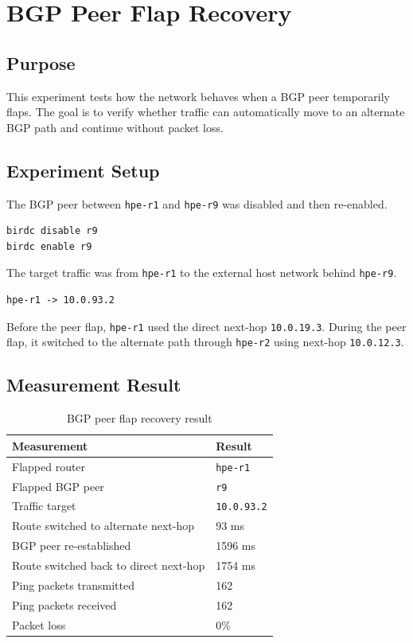 \section{BGP Peer Flap Recovery}

\subsection{Purpose}

This experiment tests how the network behaves when a BGP peer temporarily flaps. The goal is to verify whether traffic can automatically move to an alternate BGP path and continue without packet loss.

\subsection{Experiment Setup}

The BGP peer between \texttt{hpe-r1} and \texttt{hpe-r9} was disabled and then re-enabled.

\begin{verbatim}
birdc disable r9
birdc enable r9
\end{verbatim}

The target traffic was from \texttt{hpe-r1} to the external host network behind \texttt{hpe-r9}.

\begin{verbatim}
hpe-r1 -> 10.0.93.2
\end{verbatim}

Before the peer flap, \texttt{hpe-r1} used the direct next-hop \texttt{10.0.19.3}. During the peer flap, it switched to the alternate path through \texttt{hpe-r2} using next-hop \texttt{10.0.12.3}.

\subsection{Measurement Result}

\begin{table}[H]
\centering
\small
\renewcommand{\arraystretch}{1.25}
\begin{tabular}{|p{6cm}|p{5cm}|}
\hline
\textbf{Measurement} & \textbf{Result} \\
\hline
Flapped router & \texttt{hpe-r1} \\
\hline
Flapped BGP peer & \texttt{r9} \\
\hline
Traffic target & \texttt{10.0.93.2} \\
\hline
Route switched to alternate next-hop & 93 ms \\
\hline
BGP peer re-established & 1596 ms \\
\hline
Route switched back to direct next-hop & 1754 ms \\
\hline
Ping packets transmitted & 162 \\
\hline
Ping packets received & 162 \\
\hline
Packet loss & 0\% \\
\hline
\end{tabular}
\caption{BGP peer flap recovery result}
\end{table}

